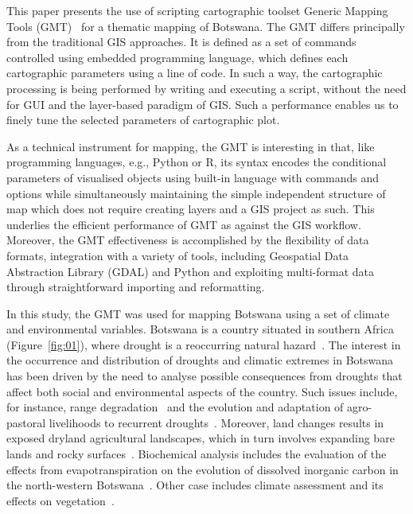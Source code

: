 \documentclass[ijgi,article,accept,pdftex,moreauthors]{Definitions/mdpi}
\begin{document}
This paper presents the use of scripting cartographic toolset Generic Mapping Tools (GMT)~\cite{Wessel} for a thematic mapping of Botswana. The GMT differs principally from the traditional GIS approaches. It is defined as a set of commands controlled using embedded programming language, which defines each cartographic parameters using a line of code. In such a way, the cartographic processing is being performed by  writing and executing a script, without the need for GUI and the layer-based paradigm of GIS. Such a performance enables us to finely tune the selected parameters of cartographic plot.%

As a technical instrument for mapping, the GMT is interesting in that, like programming languages, e.g., Python or R, its syntax encodes the conditional parameters of visualised objects using built-in language with commands and options while simultaneously maintaining the simple independent structure of map which does not require creating layers and a GIS project as such. This underlies the efficient performance of GMT as against the GIS workflow. Moreover, the GMT effectiveness is accomplished by the flexibility of data formats, integration with a variety of tools, including Geospatial Data Abstraction Library (GDAL) and Python and exploiting multi-format data through straightforward importing and reformatting.

In this study, the GMT was used for mapping Botswana using a set of climate and environmental variables. Botswana is a country situated in southern Africa (Figure~\ref{fig:01}), where drought is a reoccurring natural hazard~\cite{Batisani2011}. The interest in the occurrence and distribution of droughts and climatic extremes in Botswana has been driven by the need to analyse possible consequences from droughts that affect both social and environmental aspects of the country. Such issues include, for instance, range degradation~\cite{Vanderpost} and the evolution and adaptation of agro-pastoral livelihoods to recurrent droughts~\cite{Mogotsi}. Moreover, land changes  results in exposed dryland agricultural landscapes, which in turn involves expanding bare lands and rocky surfaces~\cite{Akinyemi}. Biochemical analysis includes the evaluation of the effects from evapotranspiration on the evolution of dissolved inorganic carbon in the north-western Botswana~\cite{Atekwana}. Other case includes climate assessment and its effects on vegetation~\cite{Ringrose2002}. 
\end{document}
